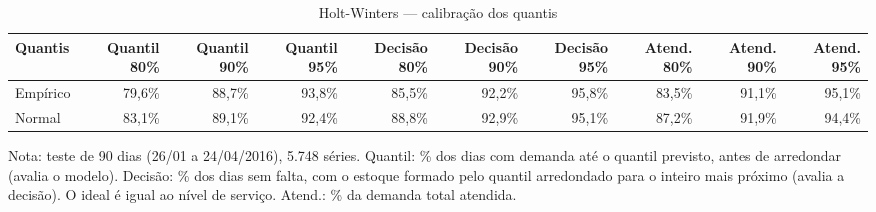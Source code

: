 \begin{table}[htbp]
\centering
\small
\caption{Holt-Winters — calibração dos quantis}
\label{tab:hw_calibracao}
\begin{tabular}{lrrrrrrrrr}
\toprule
Quantis & Quantil 80\% & Quantil 90\% & Quantil 95\% & Decisão 80\% & Decisão 90\% & Decisão 95\% & Atend. 80\% & Atend. 90\% & Atend. 95\% \\
\midrule
Empírico & 79,6\% & 88,7\% & 93,8\% & 85,5\% & 92,2\% & 95,8\% & 83,5\% & 91,1\% & 95,1\% \\
Normal & 83,1\% & 89,1\% & 92,4\% & 88,8\% & 92,9\% & 95,1\% & 87,2\% & 91,9\% & 94,4\% \\
\bottomrule
\end{tabular}
\par\smallskip
{\footnotesize Nota: teste de 90 dias (26/01 a 24/04/2016), 5.748 séries. Quantil: \% dos dias com demanda até o quantil previsto, antes de arredondar (avalia o modelo). Decisão: \% dos dias sem falta, com o estoque formado pelo quantil arredondado para o inteiro mais próximo (avalia a decisão). O ideal é igual ao nível de serviço. Atend.: \% da demanda total atendida.}
\end{table}
